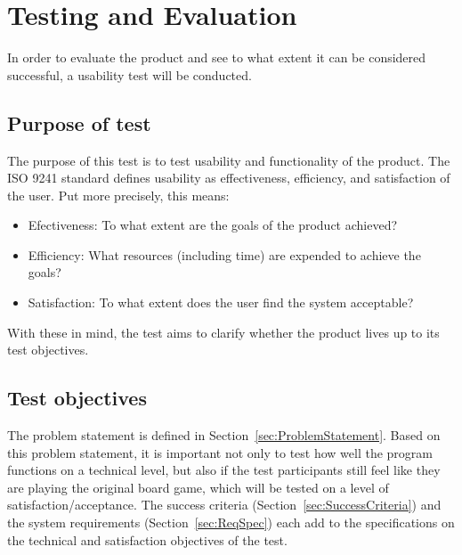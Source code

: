 \chapter{Testing and Evaluation}\label{ch:testeval}
In order to evaluate the product and see to what extent it can be considered successful, a usability test will be conducted.

\section{Purpose of test}
The purpose of this test is to test usability and functionality of the product. The ISO 9241 \citep{ISO} standard defines usability as effectiveness, efficiency, and satisfaction of the user. Put more precisely, this means:
\begin{itemize}
\item Efectiveness: To what extent are the goals of the product achieved?
\item Efficiency: What resources (including time) are expended to achieve the goals?
\item Satisfaction: To what extent does the user find the system acceptable?
\end{itemize}
With these in mind, the test aims to clarify whether the product lives up to its test objectives.

\section{Test objectives}
The problem statement is defined in Section~\ref{sec:ProblemStatement}. Based on this problem statement, it is important not only to test how well the program functions on a technical level, but also if the test participants still feel like they are playing the original board game, which will be tested on a level of satisfaction/acceptance.
The success criteria (Section~\ref{sec:SuccessCriteria}) and the system requirements (Section~\ref{sec:ReqSpec}) each add to the specifications on the technical and satisfaction  objectives of the test.

